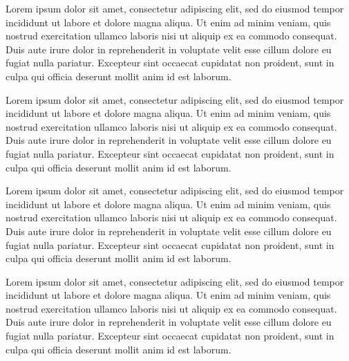   Lorem ipsum dolor sit amet, consectetur adipiscing elit, sed do eiusmod tempor
 incididunt ut labore et dolore magna aliqua. Ut enim ad minim veniam, quis nostrud exercitation ullamco laboris nisi ut aliquip ex ea commodo consequat. Duis aute irure dolor in reprehenderit in voluptate velit esse cillum dolore eu fugiat nulla pariatur. Excepteur sint occaecat cupidatat non proident, sunt in culpa qui officia deserunt mollit anim id est laborum.
 
  Lorem ipsum dolor sit amet, consectetur adipiscing elit, sed do eiusmod tempor
 incididunt ut labore et dolore magna aliqua. Ut enim ad minim veniam, quis nostrud exercitation ullamco laboris nisi ut aliquip ex ea commodo consequat. Duis aute irure dolor in reprehenderit in voluptate velit esse cillum dolore eu fugiat nulla pariatur. Excepteur sint occaecat cupidatat non proident, sunt in culpa qui officia deserunt mollit anim id est laborum.
 
  Lorem ipsum dolor sit amet, consectetur adipiscing elit, sed do eiusmod tempor
 incididunt ut labore et dolore magna aliqua. Ut enim ad minim veniam, quis nostrud exercitation ullamco laboris nisi ut aliquip ex ea commodo consequat. Duis aute irure dolor in reprehenderit in voluptate velit esse cillum dolore eu fugiat nulla pariatur. Excepteur sint occaecat cupidatat non proident, sunt in culpa qui officia deserunt mollit anim id est laborum.
 
  Lorem ipsum dolor sit amet, consectetur adipiscing elit, sed do eiusmod tempor
 incididunt ut labore et dolore magna aliqua. Ut enim ad minim veniam, quis nostrud exercitation ullamco laboris nisi ut aliquip ex ea commodo consequat. Duis aute irure dolor in reprehenderit in voluptate velit esse cillum dolore eu fugiat nulla pariatur. Excepteur sint occaecat cupidatat non proident, sunt in culpa qui officia deserunt mollit anim id est laborum.
 
 
 